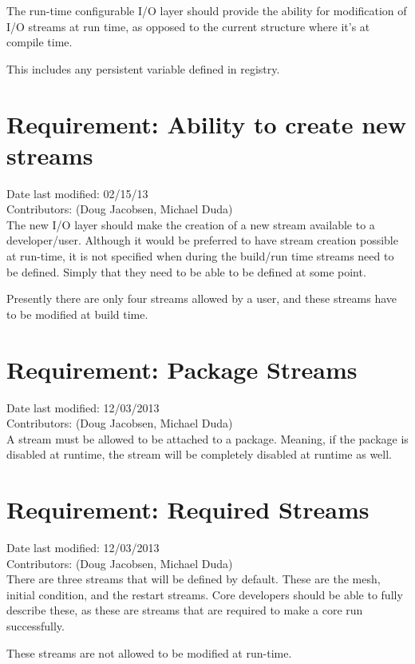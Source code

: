\documentclass[11pt]{report}
\begin{document}
The run-time configurable I/O layer should provide the ability for modification
of I/O streams at run time, as opposed to the current structure where it's at
compile time.

This includes any persistent variable defined in registry.

\section{Requirement: Ability to create new streams}
Date last modified: 02/15/13 \\
Contributors: (Doug Jacobsen, Michael Duda) \\

The new I/O layer should make the creation of a new stream available to a
developer/user. Although it would be preferred to have stream creation possible
at run-time, it is not specified when during the build/run time streams need to
be defined. Simply that they need to be able to be defined at some point.

Presently there are only four streams allowed by a user, and these streams have
to be modified at build time.

\section{Requirement: Package Streams}
Date last modified: 12/03/2013 \\
Contributors: (Doug Jacobsen, Michael Duda) \\

A stream must be allowed to be attached to a package. Meaning, if the package is disabled at runtime, the stream will be completely disabled at runtime as well.

\section{Requirement: Required Streams}
Date last modified: 12/03/2013 \\
Contributors: (Doug Jacobsen, Michael Duda) \\

There are three streams that will be defined by default. These are the mesh,
initial condition, and the restart streams. Core developers should be able to
fully describe these, as these are streams that are required to make a core run
successfully.

These streams are not allowed to be modified at run-time.
\end{document}
